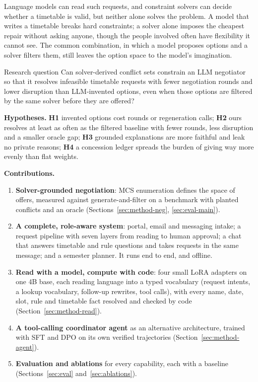 \documentclass[11pt,a4paper]{article}
\begin{document}
Language models can read such requests, and constraint solvers can decide whether a timetable is valid, but neither
alone solves the problem. A model that writes a timetable breaks hard constraints; a solver alone imposes the
cheapest repair without asking anyone, though the people involved often have flexibility it cannot see. The common
combination, in which a model proposes options and a solver filters them, still leaves the option space to the
model's imagination.

\begin{bluebox}{Research question}
\small Can solver-derived conflict sets constrain an LLM negotiator so that it resolves infeasible timetable
requests with fewer negotiation rounds and lower disruption than LLM-invented options, even when those options are
filtered by the same solver before they are offered?
\end{bluebox}

\noindent\textbf{Hypotheses.} \textbf{H1} invented options cost rounds or regeneration calls; \textbf{H2} ours
resolves at least as often as the filtered baseline with fewer rounds, less disruption and a smaller oracle gap;
\textbf{H3} grounded explanations are more faithful and leak no private reasons; \textbf{H4} a concession ledger
spreads the burden of giving way more evenly than flat weights.

\noindent\textbf{Contributions.}
\begin{enumerate}
\item \textbf{Solver-grounded negotiation}: MCS enumeration defines the space of offers, measured against
generate-and-filter on a benchmark with planted conflicts and an oracle (Sections~\ref{sec:method-neg},
\ref{sec:eval-main}).
\item \textbf{A complete, role-aware system}: portal, email and messaging intake; a request pipeline with seven
layers from reading to human approval; a chat that answers timetable and rule questions and takes requests in the
same message; and a semester planner. It runs end to end, and offline.
\item \textbf{Read with a model, compute with code}: four small LoRA adapters on one 4B base, each reading language
into a typed vocabulary (request intents, a lookup vocabulary, follow-up rewrites, tool calls), with every name,
date, slot, rule and timetable fact resolved and checked by code (Section~\ref{sec:method-read}).
\item \textbf{A tool-calling coordinator agent} as an alternative architecture, trained with SFT and DPO on its own
verified trajectories (Section~\ref{sec:method-agent}).
\item \textbf{Evaluation and ablations} for every capability, each with a baseline (Sections~\ref{sec:eval}
and~\ref{sec:ablations}).
\end{enumerate}
\end{document}
